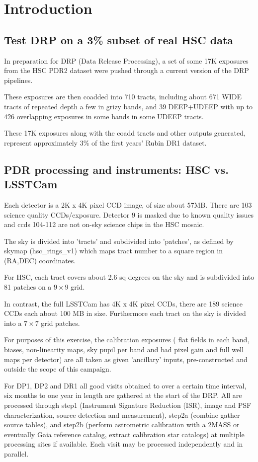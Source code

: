 \section{Introduction}\label{sec:intro}

\subsection{Test DRP on a 3\% subset of real HSC data}

In preparation for DRP (Data Release Processing), a set of
some 17K exposures from the HSC PDR2 dataset were pushed through
a current version of the DRP pipelines.

These exposures are then coadded into 710 tracts, including about 671
WIDE tracts of repeated depth a few in grizy bands, and 39 DEEP+UDEEP with
up to 426 overlapping exposures in some bands in some UDEEP tracts.

These 17K exposures along with the coadd tracts and other
outputs generated, represent approximately 3\% of the first 
years' Rubin DR1 dataset.

\subsection{PDR processing and instruments: HSC vs. LSSTCam}

Each detector is a 2K x 4K pixel CCD image, of size about 57MB.
There are 103 science quality CCDs/exposure.  Detector 9 is masked due
to known quality issues and ccds 104-112 are not on-sky science chips in
the HSC mosaic.

The sky is divided into 'tracts' and subdivided into 'patches',
as defined by skymap (hsc\_rings\_v1) which maps tract number to a
square region in (RA,DEC) coordinates.

For HSC, each tract covers about 2.6 sq degrees on the sky and is
subdivided into 81 patches on a $9 \times 9$ grid.


In contrast, the full LSSTCam has 4K x 4K pixel CCDs, there are 
189 science CCDs each about 100 MB in size.  Furthermore each tract 
on the sky is divided into a $7\times 7$ grid patches.

For purposes of this exercise, the calibration exposures (
flat fields in each band, biases, non-linearity maps, sky pupil per 
band and bad pixel gain and full well maps per detector) are all
taken as given 'ancillary' inputs, pre-constructed and outside the
scope of this campaign.

For DP1, DP2 and DR1 all good visits obtained to over a certain time
interval, six months to one year in length are gathered at the
start of the DRP.  All are processed through step1 (Instrument Signature
Reduction (ISR), image and PSF characterization, source detection and 
measurement), step2a (combine gather source tables), and step2b (perform 
astrometric calibration with a 2MASS or eventually Gaia reference catalog,
extract calibration star catalogs) 
at multiple processing sites if available.  Each visit may be processed
independently and in parallel.

